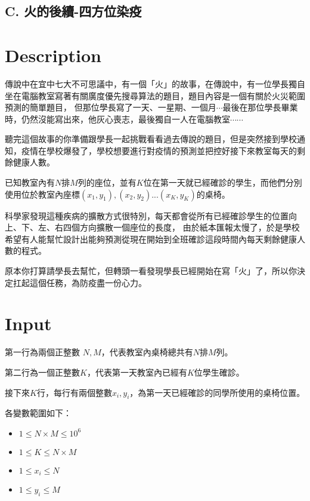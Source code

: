 \documentclass[11pt,a4paper]{article}
\begin{document}
\begin{center}
\section*{C. 火的後續-四方位染疫}
\end{center}

\section*{Description}

傳說中在宜中七大不可思議中，有一個「火」的故事，在傳說中，有一位學長獨自坐在電腦教室寫著有關廣度優先搜尋算法的題目，題目內容是一個有關於火災範圍預測的簡單題目，
但那位學長寫了一天、一星期、一個月$\cdots$最後在那位學長畢業時，仍然沒能寫出來，他灰心喪志，最後獨自一人在電腦教室$\cdots\cdots$

聽完這個故事的你準備跟學長一起挑戰看看過去傳說的題目，但是突然接到學校通知，疫情在學校爆發了，學校想要進行對疫情的預測並把控好接下來教室每天的剩餘健康人數。

已知教室內有$N$排$M$列的座位，並有$K$位在第一天就已經確診的學生，而他們分別使用位於教室內座標$(x_1, y_1), (x_2, y_2)... (x_K, y_K)$的桌椅。

科學家發現這種疾病的擴散方式很特別，每天都會從所有已經確診學生的位置向上、下、左、右四個方向擴散一個座位的長度，
由於紙本匯報太慢了，於是學校希望有人能幫忙設計出能夠預測從現在開始到全班確診這段時間內每天剩餘健康人數的程式。 

原本你打算請學長去幫忙，但轉頭一看發現學長已經開始在寫「火」了，所以你決定扛起這個任務，為防疫盡一份心力。

	
\section*{Input}

第一行為兩個正整數 $N, M$，代表教室內桌椅總共有$N$排$M$列。

第二行為一個正整數$K$，代表第一天教室內已經有$K$位學生確診。 

接下來$K$行，每行有兩個整數$x_i,y_i$，為第一天已經確診的同學所使用的桌椅位置。

各變數範圍如下：
\begin{itemize}
    \item $1 \le N \times M \le 10^6$
    \item $1 \le K \le N \times M$
    \item $1 \le x_i \leq N$
    \item $1 \le y_i \leq M$
\end{itemize}\
\end{document}

